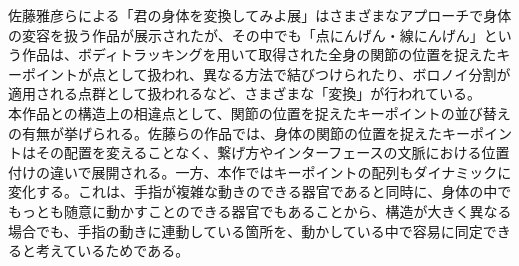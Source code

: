 佐藤雅彦らによる「君の身体を変換してみよ展」はさまざまなアプローチで身体の変容を扱う作品が展示されたが、その中でも「点にんげん・線にんげん」という作品は、ボディトラッキングを用いて取得された全身の関節の位置を捉えたキーポイントが点として扱われ、異なる方法で結びつけられたり、ボロノイ分割が適用される点群として扱われるなど、さまざまな「変換」が行われている。\\
本作品との構造上の相違点として、関節の位置を捉えたキーポイントの並び替えの有無が挙げられる。佐藤らの作品では、身体の関節の位置を捉えたキーポイントはその配置を変えることなく、繋げ方やインターフェースの文脈における位置付けの違いで展開される。一方、本作ではキーポイントの配列もダイナミックに変化する。これは、手指が複雑な動きのできる器官であると同時に、身体の中でもっとも随意に動かすことのできる器官でもあることから、構造が大きく異なる場合でも、手指の動きに連動している箇所を、動かしている中で容易に同定できると考えているためである。


